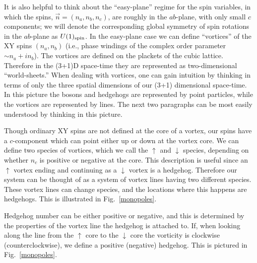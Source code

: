 It is also helpful to think about the ``easy-plane'' regime for the spin variables, in which the spins, $\vec{n} = (n_a, n_b, n_c)$, are roughly in the $ab$-plane, with only small $c$ components; we will denote the corresponding global symmetry of spin rotations in the $ab$-plane as $U(1)_{\rm spin}$. In the easy-plane case we can define ``vortices'' of the XY spins $(n_a, n_b)$ (i.e., phase windings of the complex order parameter $\sim n_a + i n_b$). %
The vortices are defined on the plackets of the cubic lattice. Therefore in the (3+1)D space-time they are represented as two-dimensional ``world-sheets.'' When dealing with vortices, one can gain intuition by thinking in terms of only the three spatial dimensions of our (3+1) dimensional space-time. In this picture the bosons and hedgehogs are represented by point particles, while the vortices are represented by lines. The next two paragraphs can be most easily understood by thinking in this picture.

Though ordinary XY spins are not defined at the core of a vortex, our spins have a $c$-component which can point either up or down at the vortex core. We can define two species of vortices, which we call the $\uparrow$ and $\downarrow$ species, depending on whether $n_c$ is positive or negative at the core. This description is useful since an $\uparrow$ vortex ending and continuing as a $\downarrow$ vortex is a hedgehog. Therefore our system can be thought of as a system of vortex lines having two different species. These vortex lines can change species, and the locations where this happens are hedgehogs.\cite{LesikSenthil} This is illustrated in Fig.~\ref{monopoles}.

Hedgehog number can be either positive or negative, and this is determined by the properties of the vortex line the hedgehog is attached to.
If, when looking along the line from the $\uparrow$ core to the $\downarrow$ core the vorticity is clockwise (counterclockwise), we define a positive (negative) hedgehog.  This is pictured in Fig.~\ref{monopoles}.


